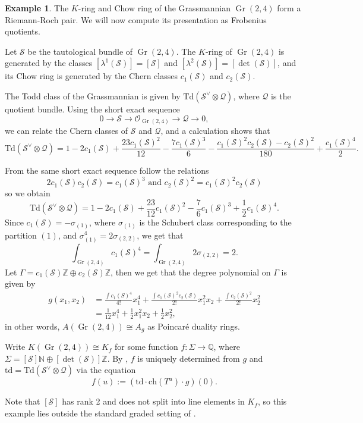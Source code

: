 \documentclass[oneside]{amsart}
\theoremstyle{plain}
\theoremstyle{definition}
\newtheorem{example}[theorem]{Example}
\newcommand{\Z}{{\mathbb{Z}}}
\newcommand{\N}{{\mathbb{N}}}
\newcommand{\Q}{{\mathbb{Q}}}
\newcommand{\cO}{{\mathcal{O}}}
\newcommand{\cS}{{\mathcal{S}}}
\newcommand{\cQ}{{\mathcal{Q}}}
\newcommand{\Gr}{\operatorname{Gr}}
\newcommand{\ch}{{\mathrm{ch}}}
\newcommand{\td}{{\mathrm{td}}}
\newcommand{\Td}{{\mathrm{Td}}}
\begin{document}
\begin{example}\label{example:grassmannian-2-4}
     The $K$-ring and Chow ring of the Grassmannian $\Gr(2, 4)$ form a Riemann-Roch pair. We will now compute its presentation as Frobenius quotients.
    
    Let $\cS$ be the tautological bundle of $\Gr(2, 4)$.
    The $K$-ring of $\Gr(2, 4)$ is generated by the classes $[\lambda^1(\cS)] = [\cS]$ and $[\lambda^2(\cS)] = [\det(\cS)]$, and
    its Chow ring is generated by the Chern classes $c_1(\cS)$ and $c_2(\cS)$.

    The Todd class of the Grassmannian is given by $\Td(\cS^\vee \otimes \cQ)$, where $\cQ$ is the quotient bundle. Using the short exact sequence
    \[
        0 \to \cS \to \cO_{\Gr(2, 4)} \to \cQ \to 0,
    \]
    we can relate the Chern classes of $\cS$ and $\cQ$, and a calculation shows that
    \[
        \Td(\cS^\vee \otimes \cQ) = 
        1 - 2 c_1(\cS) + \frac{23c_1(\cS)^2}{12}  - \frac{7c_1(\cS)^3}{6}
        -\frac{c_1(\cS)^2 c_2(\cS) - c_2(\cS)^2}{180} + \frac{c_1(\cS)^4}{2}.
    \]

    From the same short exact sequence follow the relations 
    \[
        2c_1(\cS)c_2(\cS) = c_1(\cS)^3\textrm{ and } c_2(\cS)^2 = c_1(\cS)^2c_2(\cS)
    \]
    so we obtain
    \[
        \Td(\cS^\vee \otimes \cQ) = 
        1 - 2 c_1(\cS) + \frac{23}{12}c_1(\cS)^2  - \frac{7}{6}c_1(\cS)^3
        + \frac{1}{2}c_1(\cS)^4.
    \]
    Since $c_1(\cS) = -\sigma_{(1)}$, where $\sigma_{(1)}$ is the Schubert class corresponding to the partition $(1)$, and $\sigma_{(1)}^4 = 2\sigma_{(2, 2)}$, we get that 
    \[
        \int_{\Gr(2, 4)} c_1(\cS)^4 = \int_{\Gr(2, 4)} 2\sigma_{(2, 2)} = 2.
    \]
    Let $\Gamma = c_1(\cS)\Z \oplus c_2(\cS)\Z$, then we get that the degree polynomial on $\Gamma$ is given by
    \begin{align*}
        g(x_1, x_2) &= \frac{\int c_1(S)^4}{4!}x_1^4 + \frac{\int c_1(\cS)^2c_2(\cS)}{2!}x_1^2x_2 + \frac{\int c_2(\cS)^2}{2!}x_2^2\\
        &= \frac{1}{12}x_1^4 + \frac{1}{2}x_1^2 x_2 + \frac{1}{2}x_2^2,
    \end{align*}
    in other words, $A(\Gr(2, 4)) \cong A_g$ as Poincar\'e duality rings.

    Write $K(\Gr(2, 4)) \cong K_f$ for some function $f: \Sigma \to \Q$, where $\Sigma = [\cS] \N \oplus [\det(\cS)] \Z$.
    By , $f$ is uniquely determined from $g$ and $\td = \Td(\cS^\vee \otimes \cQ)$ via the equation
    \[f(u) := (\td \cdot \ch(T^u) \cdot g) (0).\]

    Note that $[\cS]$ has rank 2 and does not split into line elements in $K_f$,
    so this example lies outside the standard graded setting of .
\end{example}
\end{document}
